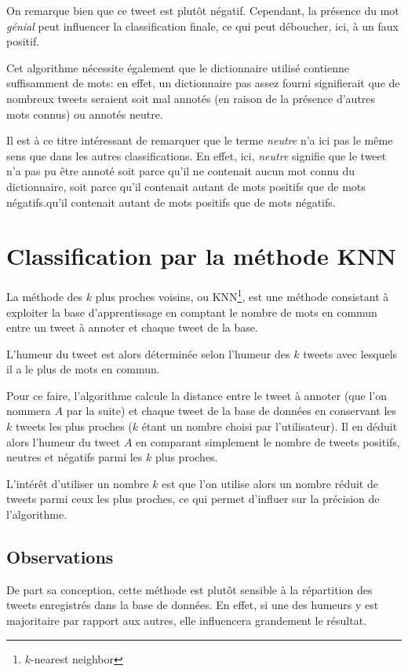 \documentclass[12pt,a4paper]{report}
\begin{document}
On remarque bien que ce tweet est plutôt négatif. Cependant, la présence du mot
\textit{génial} peut influencer la classification finale, ce qui peut déboucher,
ici, à un faux positif.

Cet algorithme nécessite également que le dictionnaire utilisé contienne
suffisamment de mots: en effet, un dictionnaire pas assez fourni signifierait
que de nombreux tweets seraient soit mal annotés (en raison de la présence
d'autres mots connus) ou annotés neutre.

Il est à ce titre intéressant de remarquer que le terme \textit{neutre} n'a ici
pas le même sens que dans les autres classifications. En effet, ici,
\textit{neutre} signifie que le tweet n'a pas pu être annoté soit parce qu'il ne
contenait aucun mot connu du dictionnaire, soit parce qu'il contenait autant de
mots positifs que de mots négatifs.qu'il contenait autant de mots positifs que
de mots négatifs.

\section{Classification par la méthode KNN}
La méthode des $k$ plus proches voisins, ou KNN\footnote{$k$-nearest neighbor},
est une méthode consistant à exploiter la base d'apprentissage en comptant le
nombre de mots en commun entre un tweet à annoter et chaque tweet de la base.

L'humeur du tweet est alors déterminée selon l'humeur des $k$ tweets
avec lesquels il a le plus de mots en commun.

Pour ce faire, l'algorithme calcule la distance entre le tweet à annoter (que
l'on nommera $A$ par la suite) et chaque tweet de la base de données
en conservant les $k$ tweets les plus proches ($k$ étant un nombre
choisi par l'utilisateur). Il en déduit alors l'humeur du tweet $A$ en comparant
simplement le nombre de tweets positifs, neutres et négatifs parmi les $k$ plus
proches.

L'intérêt d'utiliser un nombre $k$ est que l'on utilise alors un nombre réduit
de tweets parmi ceux les plus proches, ce qui permet d'influer sur la précision
de l'algorithme.

\subsection{Observations}
De part sa conception, cette méthode est plutôt sensible à la répartition des
tweets enregistrés dans la base de données. En effet, si une des humeurs y est
majoritaire par rapport aux autres, elle influencera grandement le résultat.
\end{document}
